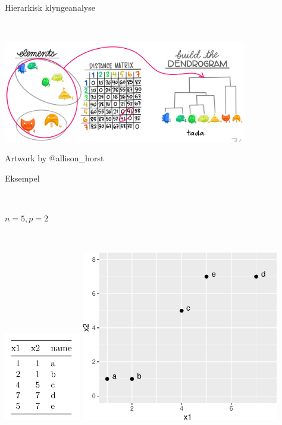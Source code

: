 \documentclass[10pt,ignorenonframetext,]{beamer}
\begin{document}
\begin{frame}{Hierarkisk klyngeanalyse}
\protect\hypertarget{hierarkisk-klyngeanalyse}{}

\(~\)

\includegraphics[width=0.8\textwidth,height=\textheight]{hierclust_AllisonHorst.png}

\tiny Artwork by @allison\_horst

\end{frame}

\begin{frame}

\begin{block}{Eksempel}

\(~\)

\(n=5, p=2\)

\(~\)

\includegraphics[width=0.25\textwidth,height=\textheight]{table.png}
\includegraphics[width=0.65\textwidth,height=\textheight]{exampleplot-1.pdf}

\end{block}

\end{frame}
\end{document}
